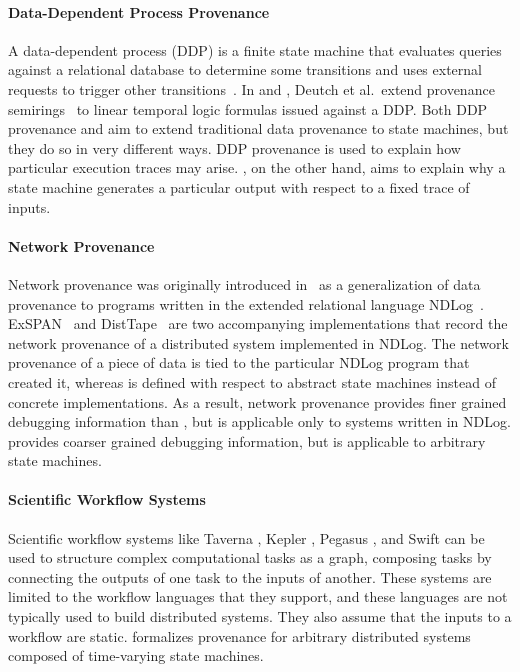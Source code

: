 \paragraph{Data-Dependent Process Provenance}
A data-dependent process (DDP) is a finite state machine that evaluates queries
against a relational database to determine some transitions and uses external
requests to trigger other transitions~\cite{deutch2014provenance,
deutch2015provenance}. In \cite{deutch2014provenance} and
\cite{deutch2015provenance}, Deutch et al.\ extend provenance
semirings~\cite{green2007provenance} to linear temporal logic formulas issued
against a DDP.
%
Both DDP provenance and \watprovenance{} aim to extend traditional data
provenance to state machines, but they do so in very different ways. DDP
provenance is used to explain how particular execution traces may arise.
%
%
\Watprovenance{}, on the other hand, aims to explain why a state machine
generates a particular output with respect to a fixed trace of inputs.

\paragraph{Network Provenance}
Network provenance was originally introduced in~\cite{zhou2010efficient} as a
generalization of data provenance to programs written in the extended
relational language NDLog~\cite{loo2006design}. ExSPAN~\cite{zhou2010efficient}
and DistTape~\cite{zhou2012distributed} are two accompanying implementations
that record the network provenance of a distributed system implemented in
NDLog.
%
The network provenance of a piece of data is tied to the particular NDLog
program that created it, whereas \watprovenance{} is defined with respect to
abstract state machines instead of concrete implementations. As a result,
network provenance provides finer grained debugging information than
\watprovenance{}, but is applicable only to systems written in NDLog.
\Watprovenance{} provides coarser grained debugging information, but is
applicable to arbitrary state machines.

\paragraph{Scientific Workflow Systems}
Scientific workflow systems like Taverna \cite{wolstencroft2013taverna}, Kepler
\cite{altintas2006provenance}, Pegasus \cite{kim2008provenance}, and Swift
\cite{wozniak2013swift} can be used to structure complex computational tasks as
a graph, composing tasks by connecting the outputs of one task to the inputs of
another. These systems are limited to the workflow languages that they support,
and these languages are not typically used to build distributed systems. They
also assume that the inputs to a workflow are static. \Watprovenance{}
formalizes provenance for arbitrary distributed systems composed of
time-varying state machines.

